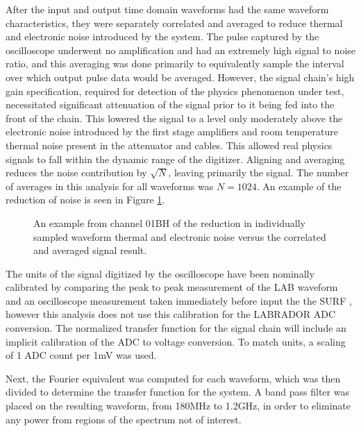 		After the input and output time domain waveforms had the same waveform characteristics, they were separately correlated and averaged to reduce thermal and electronic noise introduced by the system.  The pulse captured by the oscilloscope underwent no amplification and had an extremely high signal to noise ratio, and this averaging was done primarily to equivalently sample the interval over which output pulse data would be averaged.  However, the signal chain's high gain specification, required for detection of the physics phenomenon under test, necessitated significant attenuation of the signal prior to it being fed into the front of the chain.  This lowered the signal to a level only moderately above the electronic noise introduced by the first stage amplifiers and room temperature thermal noise present in the attenuator and cables.  This allowed real physics signals to fall within the dynamic range of the digitizer.  Aligning and averaging reduces the noise contribution by $\sqrt{N}$, leaving primarily the signal.  The number of averages in this analysis for all waveforms was $N=1024$.  An example of the reduction of noise is seen in Figure \ref{fig:sigChain_noiseReduction}.
		
\begin{figure}
\centering
{}
	\caption{An example from channel 01BH of the reduction in individually sampled waveform thermal and electronic noise versus the correlated and averaged signal result.}
\label{fig:sigChain_noiseReduction}
\end{figure}	
		
		The units of the signal digitized by the oscilloscope have been nominally calibrated by comparing the peak to peak measurement of the LAB waveform and an oscilloscope measurement taken immediately before input the the SURF , however this analysis does not use this calibration for the LABRADOR ADC conversion.  The normalized transfer function for the signal chain will include an implicit calibration of the ADC to voltage conversion.  To match units, a scaling of 1 ADC count per 1mV was used.
		
		Next, the Fourier equivalent was computed for each waveform, which was then divided to determine the transfer function for the system.  A band pass filter was placed on the resulting waveform, from 180MHz to 1.2GHz, in order to eliminate any power from regions of the spectrum not of interest.
		
		

